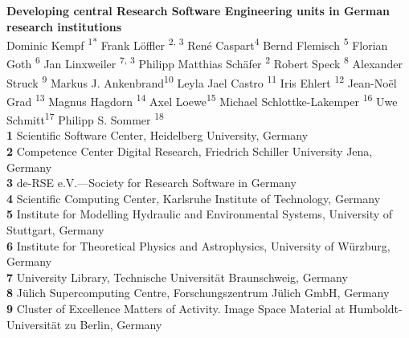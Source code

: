 \documentclass[10pt,letterpaper]{article}
\begin{document}
\vspace*{0.2in}

\begin{flushleft}
{\Large
\textbf{Developing central Research Software Engineering units in German research institutions} %
}
\newline
\\
Dominic Kempf​\textsuperscript{ 1* }
Frank Löffler​\textsuperscript{ 2, 3 }
René Caspart​\textsuperscript{ 4 }
Bernd Flemisch​\textsuperscript{ 5 }
Florian Goth​\textsuperscript{ 6 }
Jan Linxweiler​\textsuperscript{ 7, 3 }
Philipp Matthias Schäfer​\textsuperscript{ 2 }
Robert Speck​\textsuperscript{ 8 }
Alexander Struck​\textsuperscript{ 9 }
Markus J. Ankenbrand​\textsuperscript{ 10 }
Leyla Jael Castro​\textsuperscript{ 11 }
Iris Ehlert​\textsuperscript{ 12 }
Jean-Noël Grad​\textsuperscript{ 13 }
Magnus Hagdorn​\textsuperscript{ 14 }
Axel Loewe​\textsuperscript{ 15 }
Michael Schlottke-Lakemper​\textsuperscript{ 16 }
Uwe Schmitt​\textsuperscript{ 17 }
Philipp S. Sommer​\textsuperscript{ 18 }
\\
\bigskip
\textbf{ 1 } Scientific Software Center, Heidelberg University, Germany
\\
\textbf{ 2 } Competence Center Digital Research, Friedrich Schiller University Jena, Germany
\\
\textbf{ 3 } de-RSE e.V.---Society for Research Software in Germany
\\
\textbf{ 4 } Scientific Computing Center, Karlsruhe Institute of Technology, Germany
\\
\textbf{ 5 } Institute for Modelling Hydraulic and Environmental Systems, University of Stuttgart, Germany
\\
\textbf{ 6 } Institute for Theoretical Physics and Astrophysics, University of Würzburg, Germany
\\
\textbf{ 7 } University Library, Technische Universität Braunschweig, Germany
\\
\textbf{ 8 } Jülich Supercomputing Centre, Forschungszentrum Jülich GmbH, Germany
\\
\textbf{ 9 } Cluster of Excellence Matters of Activity. Image Space Material at Humboldt-Universität zu Berlin, Germany
\\

\end{flushleft}
\end{document}
